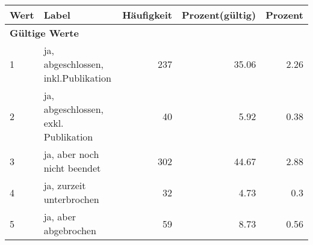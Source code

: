      \begin{longtable}{lXrrr}
     \toprule
     \textbf{Wert} & \textbf{Label} & \textbf{Häufigkeit} & \textbf{Prozent(gültig)} & \textbf{Prozent} \\
     \endhead
     \midrule
     \multicolumn{5}{l}{\textbf{Gültige Werte}}\\

     1 &
     \multicolumn{1}{X}{ ja, abgeschlossen, inkl.Publikation   } &


       \num{237} &
       \num[round-mode=places,round-precision=2]{35.06} &
         \num[round-mode=places,round-precision=2]{2.26} \\

     2 &
     \multicolumn{1}{X}{ ja, abgeschlossen, exkl. Publikation   } &


       \num{40} &
       \num[round-mode=places,round-precision=2]{5.92} &
         \num[round-mode=places,round-precision=2]{0.38} \\

     3 &
     \multicolumn{1}{X}{ ja, aber noch nicht beendet   } &


       \num{302} &
       \num[round-mode=places,round-precision=2]{44.67} &
         \num[round-mode=places,round-precision=2]{2.88} \\

     4 &
     \multicolumn{1}{X}{ ja, zurzeit unterbrochen   } &


       \num{32} &
       \num[round-mode=places,round-precision=2]{4.73} &
         \num[round-mode=places,round-precision=2]{0.3} \\

     5 &
     \multicolumn{1}{X}{ ja, aber abgebrochen   } &


       \num{59} &
       \num[round-mode=places,round-precision=2]{8.73} &
         \num[round-mode=places,round-precision=2]{0.56} \\


\end{longtable}
